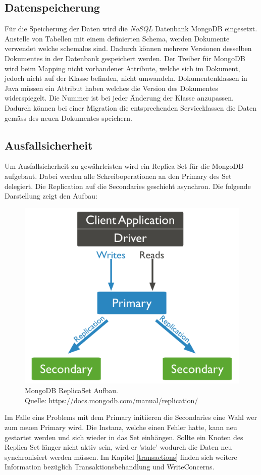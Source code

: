 \subsection{Datenspeicherung}
Für die Speicherung der Daten wird die \textit{\gls{NoSQL}} Datenbank MongoDB eingesetzt. Anstelle von Tabellen mit einem definierten Schema, werden Dokumente verwendet welche schemalos sind. Dadurch können mehrere Versionen desselben Dokumentes in der Datenbank gespeichert werden. Der Treiber für MongoDB wird beim Mapping nicht vorhandener Attribute, welche sich im Dokument, jedoch nicht auf der Klasse befinden, nicht umwandeln.\newline
Dokumentenklassen in Java müssen ein Attribut haben welches die Version des Dokumentes widerspiegelt. Die Nummer ist bei jeder Änderung der Klasse anzupassen. Dadurch können bei einer Migration die entsprechenden Serviceklassen die Daten gemäss des neuen Dokumentes speichern.
\newpage
\subsection{Ausfallsicherheit}
Um Ausfallsicherheit zu gewährleisten wird ein Replica Set für die MongoDB aufgebaut. Dabei werden alle Schreiboperationen an den Primary des Set delegiert. Die Replication auf die Secondaries geschieht asynchron. Die folgende Darstellung zeigt den Aufbau:
\begin{figure}[H]
	\centering
	\includegraphics[scale=0.6]{mongodb-replicaset.png}
	\caption{MongoDB ReplicaSet Aufbau. \\ Quelle: \url{https://docs.mongodb.com/manual/replication/}}	
\end{figure}
Im Falle eins Problems mit dem Primary initiieren die Secondaries eine Wahl wer zum neuen Primary wird. Die Instanz, welche einen Fehler hatte, kann neu gestartet werden und sich wieder in das Set einhängen. Sollte ein Knoten des Replica Set länger nicht aktiv sein, wird er 'stale' wodurch die Daten neu synchronisiert werden müssen. Im Kapitel \ref{transactions} finden sich weitere Information bezüglich Transaktionsbehandlung und WriteConcerns.

